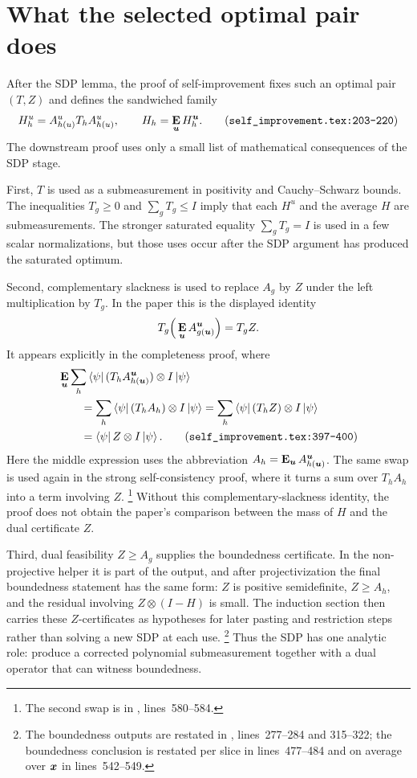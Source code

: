 \documentclass[11pt]{article}
\begin{document}
\section{What the selected optimal pair does}

After the SDP lemma, the proof of self-improvement fixes such an optimal pair
$(T,Z)$ and defines the sandwiched family
\[
  H^u_h = A^u_{h(u)} T_h A^u_{h(u)},
  \qquad
  H_h = \E_{\bu} H^{\bu}_h.
  \tag{\texttt{self\_improvement.tex:203--220}}
\]
The downstream proof uses only a small list of mathematical consequences of the
SDP stage.

First, $T$ is used as a submeasurement in positivity and Cauchy--Schwarz
bounds.  The inequalities $T_g\ge0$ and $\sum_g T_g\le I$ imply that each
$H^u$ and the average $H$ are submeasurements.  The stronger saturated equality
$\sum_gT_g=I$ is used in a few scalar normalizations, but those uses occur after
the SDP argument has produced the saturated optimum.

Second, complementary slackness is used to replace $A_g$ by $Z$ under the
left multiplication by $T_g$.  In the paper this is the displayed identity
\[
  T_g \Big(\mathop{\bf E\/}_{\boldsymbol{u}} A^{\boldsymbol{u}}_{g(\boldsymbol{u})}\Big) = T_g Z.
\]
It appears explicitly in the completeness proof, where
\begin{align}
  &\E_{\bu}\sum_h
    \bra{\psi} (T_h A^{\bu}_{h(\bu)})\otimes I\ket{\psi} \notag\\
  &\qquad = \sum_h \bra{\psi} (T_h A_h)\otimes I\ket{\psi}
   = \sum_h \bra{\psi} (T_h Z)\otimes I\ket{\psi} \notag\\
  &\qquad = \bra{\psi} Z\otimes I\ket{\psi}.
  \tag{\texttt{self\_improvement.tex:397--400}}
\end{align}
Here the middle expression uses the abbreviation
$A_h=\mathop{\bf E\/}_{\boldsymbol{u}}A^{\boldsymbol{u}}_{h(\boldsymbol{u})}$.  The same swap is used again in the strong
self-consistency proof, where it turns a sum over $T_h A_h$ into a term
involving $Z$.%
\footnote{The second swap is in
, lines~580--584.}
Without this complementary-slackness identity, the proof does not obtain the
paper's comparison between the mass of $H$ and the dual certificate $Z$.

Third, dual feasibility $Z\ge A_g$ supplies the boundedness certificate.  In
the non-projective helper it is part of the output, and after projectivization
the final boundedness statement has the same form: $Z$ is positive semidefinite,
$Z\ge A_h$, and the residual involving $Z\otimes(I-H)$ is small.  The induction
section then carries these $Z$-certificates as hypotheses for later pasting and
restriction steps rather than solving a new SDP at each use.%
\footnote{The boundedness outputs are restated in
, lines~277--284 and 315--322;
the boundedness conclusion is restated per slice in lines~477--484 and on
average over ${\boldsymbol{x}}$ in lines~542--549.}
Thus the SDP has one analytic role: produce a corrected polynomial
submeasurement together with a dual operator that can witness boundedness.
\end{document}
